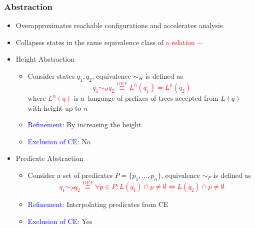 \documentclass{beamer}
\newcommand{\hlbl}[1]{\textcolor{blue}{#1}}
\newcommand{\hlgr}[1]{\textcolor{olive!50!green}{#1}}
\newcommand{\hlrd}[1]{\textcolor{red}{#1}}
\begin{document}
\begin{frame}
\frametitle{Abstraction}

	\begin{itemize}
		\item Overapproximates reachable configurations and accelerates analysis
		\item Collapses states in the same equivalence class of \hlrd{a relation $\sim$}
		\item \hlgr{Height Abstraction}
		\begin{itemize}
			\item Consider states $q_1, q_2$, equivalence $\sim_H$ is defined as
				\hlrd{$$q_1 \sim_H q_2 \stackrel{DEF}{\equiv} L^n(q_1) = L^n(q_2)$$}\noindent where
				\hlrd{$L^n(q)$} is a~language of prefixes of trees accepted from $L(q)$ with height up to $n$
			\item \hlbl{Refinement}: By increasing the height
			\item \hlbl{Exclusion of CE}: No
		\end{itemize}

	    \item \hlgr{Predicate Abstraction}
		\begin{itemize}
			\item Consider a set of predicates $P=\{p_1,\ldots,p_n\}$,
				equivalence $\sim_P$ is defined as
				\hlrd{$$q_1 \sim_P q_2 \stackrel{DEF}{\equiv} \forall p\in P: L(q_1) \cap p \neq \emptyset \Leftrightarrow L(q_2) \cap p \neq \emptyset$$}
			\item \hlbl{Refinement}: Interpolating predicates from CE
			\item \hlbl{Exclusion of CE}: Yes
		\end{itemize}
	\end{itemize}


\end{frame}

\end{document}
